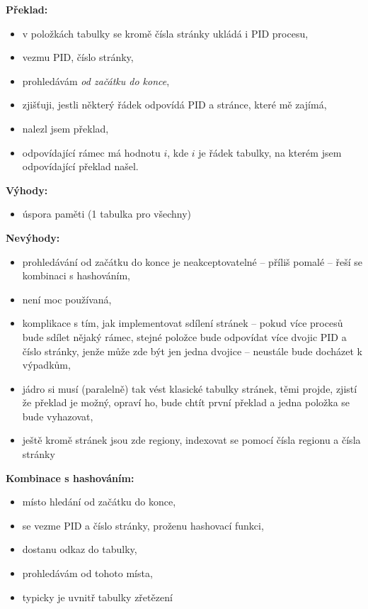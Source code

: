 \documentclass[a4paper, 11pt]{article}
\begin{document}
\textbf{Překlad:}
\begin{itemize}
    \item v položkách tabulky se kromě čísla stránky ukládá i PID procesu,
    \item vezmu PID, číslo stránky,
    \item prohledávám \emph{od začátku do konce},
    \item zjišťuji, jestli některý řádek odpovídá PID a stránce, které mě zajímá,
    \item nalezl jsem překlad,
    \item odpovídající rámec má hodnotu $i$, kde $i$ je řádek tabulky, na kterém jsem odpovídající překlad našel.
\end{itemize}
 
\textbf{Výhody:}
\begin{itemize}
    \item úspora paměti (1 tabulka pro všechny)
\end{itemize}
 
\textbf{Nevýhody:}
\begin{itemize}
    \item prohledávání od začátku do konce je neakceptovatelné -- příliš pomalé -- řeší se kombinaci s hashováním,
    \item není moc používaná,
    \item komplikace s tím, jak implementovat sdílení stránek -- pokud více procesů bude sdílet nějaký rámec, stejné položce bude odpovídat více dvojic PID a číslo stránky, jenže může zde být jen jedna dvojice -- neustále bude docházet k výpadkům,
    \item jádro si musí (paralelně) tak vést klasické tabulky stránek, těmi projde, zjistí že překlad je možný, opraví ho, bude chtít první překlad a jedna položka se bude vyhazovat,
    \item ještě kromě stránek jsou zde regiony, indexovat se pomocí čísla regionu a čísla stránky
\end{itemize}

\textbf{Kombinace s hashováním:}
\begin{itemize}
    \item místo hledání od začátku do konce,
    \item se vezme PID a číslo stránky, proženu hashovací funkci,
    \item dostanu odkaz do tabulky,
    \item prohledávám od tohoto místa,
    \item typicky je uvnitř tabulky zřetězení
\end{itemize}
 
\end{document}
